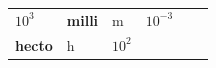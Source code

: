 {\begin{center}
\begin{xtabular*}{\mytablewidth}[t]{|p{10\mystarwidth}|p{10\mystarwidth}|p{10\mystarwidth}|p{10\mystarwidth}|p{10\mystarwidth}|p{10\mystarwidth}|}
                \begin{math}{10}^{3}\end{math}
               &
    
    
        
                \textbf{milli}
               &
    
    
        m &
    
    
        
                \begin{math}{10}^{-3}\end{math}
     \tabularnewline{}
    
    
        
                \textbf{hecto}
               &
    
    
        h &
    
    
        
                \begin{math}{10}^{2}\end{math}
               &
    

\end{xtabular*}
\end{center}}
